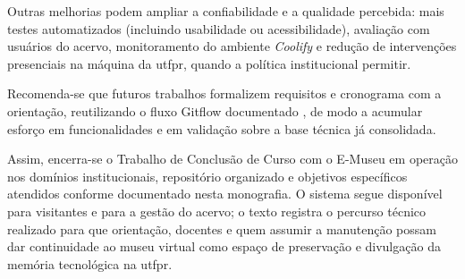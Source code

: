 Outras melhorias podem ampliar a confiabilidade e a qualidade percebida: mais testes automatizados (incluindo usabilidade ou acessibilidade), avaliação com usuários do acervo, monitoramento do ambiente \textit{Coolify} e redução de intervenções presenciais na máquina da \acrshort{utfpr}, quando a política institucional permitir.

Recomenda-se que futuros trabalhos formalizem requisitos e cronograma com a orientação, reutilizando o fluxo Gitflow documentado \cite{gitflowdoc}, de modo a acumular esforço em funcionalidades e em validação sobre a base técnica já consolidada.

Assim, encerra-se o Trabalho de Conclusão de Curso com o E-Museu em operação nos domínios institucionais, repositório organizado e objetivos específicos atendidos conforme documentado nesta monografia. O sistema segue disponível para visitantes e para a gestão do acervo; o texto registra o percurso técnico realizado para que orientação, docentes e quem assumir a manutenção possam dar continuidade ao museu virtual como espaço de preservação e divulgação da memória tecnológica na \acrshort{utfpr}.
